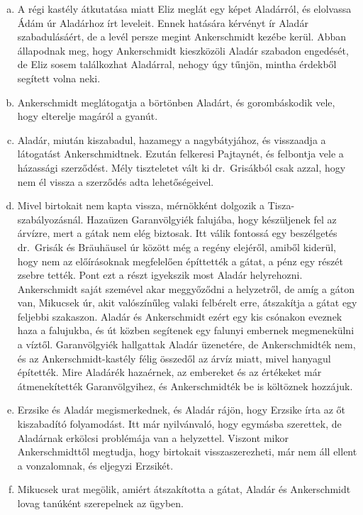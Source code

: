 \documentclass{thesis-ekf}
\begin{document}
    \begin{enumerate}[a)]
        \item\label{itm:Eliz-folyamodvany} A régi kastély átkutatása miatt Eliz meglát egy képet Aladárról,
            és elolvassa Ádám úr Aladárhoz írt leveleit.
        Ennek hatására kérvényt ír Aladár szabadulásáért, de a levél persze megint Ankerschmidt kezébe kerül.
        Abban állapodnak meg, hogy Ankerschmidt kieszközöli Aladár szabadon engedését, de Eliz sosem találkozhat Aladárral,
            nehogy úgy tűnjön, mintha érdekből segített volna neki.
        \item\label{itm:varborton} Ankerschmidt meglátogatja a börtönben Aladárt, és gorombáskodik vele, hogy elterelje magáról a gyanút.
        \item\label{itm:Aladar-hazaer} Aladár, miután kiszabadul, hazamegy a nagybátyjához, és visszaadja a látogatást Ankerschmidtnek.
        Ezután felkeresi Pajtaynét, és felbontja vele a házassági szerződést.
        Mély tiszteletet vált ki dr.~Grisákból csak azzal, hogy nem él vissza a szerződés adta lehetőségeivel.
        \item\label{itm:a-kozos-baj} Mivel birtokait nem kapta vissza, mérnökként dolgozik a Tisza-szabályozásnál.
        Hazaüzen Garanvölgyiék falujába, hogy készüljenek fel az árvízre, mert a gátak nem elég biztosak.
        Itt válik fontossá egy beszélgetés dr.~Grisák és Bräuhäusel úr között még a regény elejéről, amiből kiderül,
            hogy nem az előírásoknak megfelelően építtették a gátat, a pénz egy részét zsebre tették.
        Pont ezt a részt igyekszik most Aladár helyrehozni.
        Ankerschmidt saját szemével akar meggyőződni a helyzetről, de amíg a gáton van, Mikucsek úr, akit valószínűleg
            valaki felbérelt erre, átszakítja a gátat egy feljebbi szakaszon.
        Aladár és Ankerschmidt ezért egy kis csónakon eveznek haza a falujukba, és út közben segítenek egy falunyi embernek
            megmenekülni a víztől.
        Garanvölgyiék hallgattak Aladár üzenetére, de Ankerschmidték nem, és az Ankerschmidt-kastély félig összedől
            az árvíz miatt, mivel hanyagul építették.
        Mire Aladárék hazaérnek, az embereket és az értékeket már átmenekítették Garanvölgyihez, és Ankerschmidték
            be is költöznek hozzájuk.
        \item\label{itm:Aladar-es-Erzsike} Erzsike és Aladár megismerkednek, és Aladár rájön, hogy Erzsike írta az őt kiszabadító folyamodást.
        Itt már nyilvánvaló, hogy egymásba szerettek, de Aladárnak erkölcsi problémája van a helyzettel.
        Viszont mikor Ankerschmidttől megtudja, hogy birtokait visszaszerezheti, már nem áll ellent a vonzalomnak,
            és eljegyzi Erzsikét.
        \item\label{itm:per} Mikucsek urat megölik, amiért átszakította a gátat, Aladár és Ankerschmidt lovag tanúként szerepelnek az ügyben.
\end{enumerate}
\end{document}
